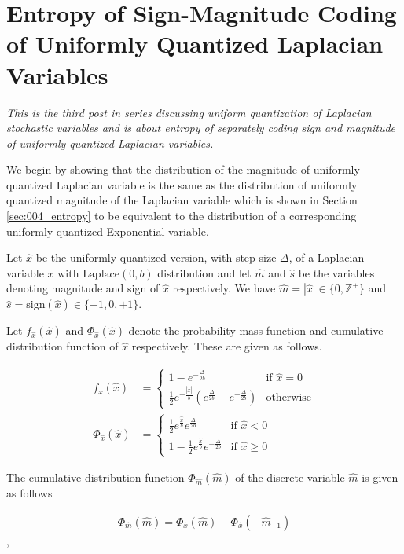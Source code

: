 \section{Entropy of Sign-Magnitude Coding of Uniformly Quantized Laplacian Variables}

\emph{This is the third post in series discussing uniform quantization of Laplacian stochastic variables and is about entropy of separately coding sign and magnitude of uniformly quantized Laplacian variables.}

We begin by showing that the distribution of the magnitude of uniformly quantized Laplacian variable is the same as the distribution of uniformly quantized magnitude of the Laplacian variable which is shown in  Section \ref{sec:004_entropy} to be equivalent to the distribution of a corresponding uniformly quantized Exponential variable.

Let $\hat{x}$ be the uniformly quantized version, with step size $\Delta$, of a Laplacian variable $x$ with $\text{Laplace}(0,b)$ distribution and let $\hat{m}$ and $\hat{s}$ be the variables denoting magnitude and sign of $\hat{x}$ respectively. We have $\hat{m} = |\hat{x}| \in \{0, \mathbb{Z}^+\}$ and $\hat{s} = \text{sign}(\hat{x}) \in \{-1, 0, +1\}$.

Let $f_{\hat{x}}(\hat{x})$ and $\Phi_{\hat{x}}(\hat{x})$ denote the probability mass function and cumulative distribution function of $\hat{x}$ respectively. These are given as follows.

\begin{align}f_{\hat{x}}(\hat{x}) &= \begin{cases}1-e^{-\frac{\Delta}{2b}} & \text{if $\hat{x} = 0$}\\ \frac{1}{2}e^{-\frac{|\hat{x}|}{b}}\left(e^{\frac{\Delta}{2b}} - e^{-\frac{\Delta}{2b}}\right) & \text{otherwise}\end{cases}\\\Phi_{\hat{x}}(\hat{x}) &= \begin{cases}\frac{1}{2}e^{\frac{\hat{x}}{b}}e^{\frac{\Delta}{2b}} & \text{if $\hat{x} < 0$}\\1-\frac{1}{2}e^{\frac{\hat{x}}{b}}e^{-\frac{\Delta}{2b}} & \text{if $\hat{x} \geq 0$}\end{cases}\end{align}

The cumulative distribution function $\Phi_{\hat{m}}(\hat{m})$ of the discrete variable $\hat{m}$ is given as follows

\begin{align}\Phi_{\hat{m}}(\hat{m}) = \Phi_{\hat{x}}(\hat{m}) - \Phi_{\hat{x}}(-\hat{m}_{+1})\end{align},

